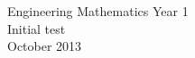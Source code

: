 \documentclass[10pt]{article}
\begin{document}

{\centering
Engineering Mathematics Year 1\\
Initial test\\
October 2013\\
\vspace{1in}
}

\hideanswers
\begin{enumerate}
    \foreachproblem[questions]{\item\label{prob:\thisproblemlabel}\thisproblem\vspace{.5in}}
\end{enumerate}
\end{document}
